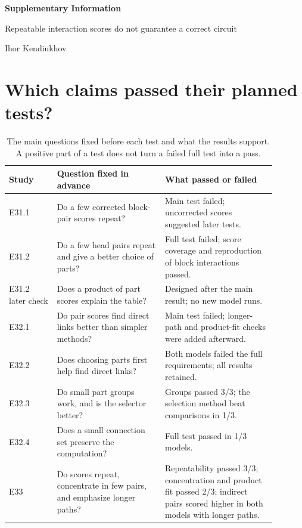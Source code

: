 \documentclass[11pt,letterpaper]{article}
\begin{document}
\linenumbers
{\Large\textbf{Supplementary Information}}

Repeatable interaction scores do not guarantee a correct circuit

Ihor Kendiukhov

\renewcommand{\thetable}{S\arabic{table}}
\section*{Which claims passed their planned tests?}
\begin{table}[H]
\singlespacing\centering\small
\caption{The main questions fixed before each test and what the results support.
A positive part of a test does not turn a failed full test into a pass.}
\begin{tabular}{>{\raggedright\arraybackslash}p{0.16\linewidth}>{\raggedright\arraybackslash}p{0.36\linewidth}>{\raggedright\arraybackslash}p{0.37\linewidth}}
\toprule
Study & Question fixed in advance & What passed or failed\\
\midrule
E31.1 & Do a few corrected block-pair scores repeat? & Main test failed;
uncorrected scores suggested later tests.\\
E31.2 & Do a few head pairs repeat and give a better choice of parts? & Full
test failed; score coverage and reproduction of block interactions passed.\\
E31.2 later check & Does a product of part scores explain the table? & Designed
after the main result; no new model runs.\\
E32.1 & Do pair scores find direct links better than simpler methods? & Main
test failed; longer-path and product-fit checks were added afterward.\\
E32.2 & Does choosing parts first help find direct links? & Both models failed
the full requirements; all results retained.\\
E32.3 & Do small part groups work, and is the selector better? & Groups passed
3/3; the selection method beat comparisons in 1/3.\\
E32.4 & Does a small connection set preserve the computation? & Full test
passed in 1/3 models.\\
E33 & Do scores repeat, concentrate in few pairs, and emphasize longer paths? &
Repeatability passed 3/3; concentration and product fit passed 2/3;
indirect pairs scored higher in both models with longer paths.\\
\bottomrule
\end{tabular}
\end{table}
\end{document}
